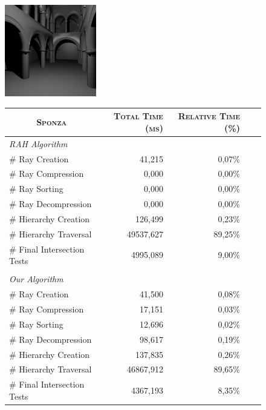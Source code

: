 \begin{figure}[!htb]
    \begin{minipage}{0.25\linewidth}
        \centering
        \includegraphics[width=4.0cm]{Images/Sponza_Preview}
    \end{minipage}
    \begin{minipage}{0.725\linewidth}
        \centering
        \fontsize{8}{10}
        \selectfont
        \begin{tabular}[h]{l|rrrr}
            \multicolumn{1}{c|}{\textsc{Sponza}} & \textsc{Total Time (ms)} & \textsc{Relative Time (\%)}\\
            \hline
            \emph{RAH Algorithm} & & \\
            \hline
            \quad \# Ray Creation               & 41,215	& 0,07\%	\\
            \quad \# Ray Compression            & 0,000     & 0,00\%	\\
            \quad \# Ray Sorting                & 0,000	    & 0,00\%    \\
            \quad \# Ray Decompression          & 0,000	    & 0,00\%    \\
            \quad \# Hierarchy Creation         & 126,499	& 0,23\%    \\
            \quad \# Hierarchy Traversal        & 49537,627	& 89,25\%   \\
            \quad \# Final Intersection Tests   & 4995,089	& 9,00\%	\\
            & & \\
            \hline
            \emph{Our Algorithm} & & \\
            \hline
            \quad \# Ray Creation               & 41,500	& 0,08\%	\\
            \quad \# Ray Compression            & 17,151    & 0,03\%	\\
            \quad \# Ray Sorting                & 12,696	& 0,02\%    \\
            \quad \# Ray Decompression          & 98,617	& 0,19\%    \\
            \quad \# Hierarchy Creation         & 137,835	& 0,26\%    \\
            \quad \# Hierarchy Traversal        & 46867,912	& 89,65\%   \\
            \quad \# Final Intersection Tests   & 4367,193	& 8,35\%	\\
        \end{tabular}
        \label{table:sponza-time-results}
    \end{minipage}
\end{figure}

